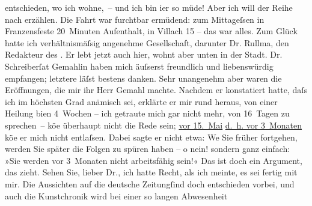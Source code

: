 \begin{ledgroupsized}[t]{13cm}
               entschieden, wo ich wohne, – und ich bin i{\geminationm}er so müde!
               Aber ich will der Reihe nach erzählen.\pend
           \pstart
           Die Fahrt war furchtbar ermüdend: zum Mittageſsen in Franzensfeste 20 Minuten Aufenthalt, in Villach 15 – das war alles. Zum Glück hatte ich verhältnismäſsig angenehme
               Gesellschaft, darunter Dr. Rullma{\geminationn}, den Redakteur des \label{K_L00176-2v}\label{K_L00176-2h}. Er lebt jetzt
               auch hier, wohnt aber unten in der Stadt.\pend
           \pstart
           Dr. Schreiberſa{\geminationm}t Gemahlin haben mich äuſserst freundlich und
               liebenswürdig empfangen; letztere läſst bestens danken. Sehr unangenehm aber waren
               die Eröffnungen, die mir ihr Herr Gemahl machte. Nachdem er konstatiert hatte, daſs ich im höchsten Grad
               anämisch sei, erklärte er mir rund heraus, von einer Heilung bi{\geminationn}en 4 Wochen – ich getraute mich gar nicht mehr, von
               16 Tagen zu sprechen – kö{\geminationn}e überhaupt nicht die Rede
               sein; \uline{vor 15. Mai}{ }{\pb}\uline{d. h. vor 3 Monaten} kö{\geminationn}e
               er mich nicht entlaſsen. Dabei sagte er nicht etwa: We{\geminationn}
               Sie früher fortgehen, werden Sie später die Folgen zu spüren haben – o nein! sondern
               ganz einfach: »Sie werden vor 3 Monaten nicht arbeitsfähig sein!« Das ist doch ein
               Argument, das zieht.\pend
           \pstart
           Sehen Sie, lieber Dr., ich hatte Recht, als ich meinte, es sei fertig mit mir. Die
               Aussichten auf die deutsche Zeitungſind doch entschieden vorbei, und auch die Kunstchronik wird bei einer so langen Abwesenheit

\end{ledgroupsized}
